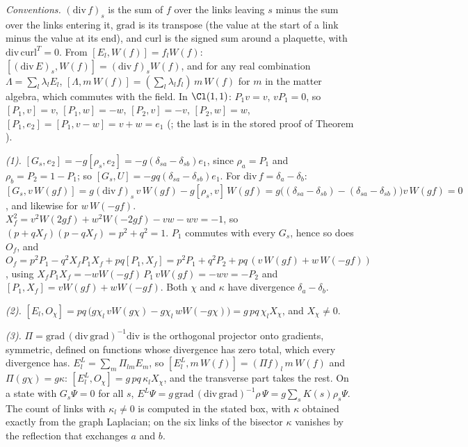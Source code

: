 \emph{Conventions.} $(\mathrm{div}\,f)_{s}$ is the sum of $f$ over the links leaving $s$ minus the sum over the links entering it, $\mathrm{grad}$ is its transpose (the value at the start of a link minus the value at its end), and $\mathrm{curl}$ is the signed sum around a plaquette, with $\mathrm{div}\,\mathrm{curl}^{T} = 0$. From $[E_{l}, W(f)] = f_{l}W(f)$: $[(\mathrm{div}\,E)_{s}, W(f)] = (\mathrm{div}\,f)_{s}W(f)$, and for any real combination $\Lambda = \sum_{l}\lambda_{l}E_{l}$, $[\Lambda, m\,W(f)] = (\sum_{l}\lambda_{l}f_{l})\,m\,W(f)$ for $m$ in the matter algebra, which commutes with the field. In $\Cl(1,1)$: $P_{1}v = v$, $vP_{1} = 0$, so $[P_{1}, v] = v$, $[P_{1}, w] = -w$, $[P_{2}, v] = -v$, $[P_{2}, w] = w$, $[P_{1}, e_{2}] = [P_{1}, v - w] = v + w = e_{1}$ (; the last is in the stored proof of Theorem ).

\emph{(1).} $[G_{s}, e_{2}] = -g[\rho_{s}, e_{2}] = -g(\delta_{sa} - \delta_{sb})e_{1}$, since $\rho_{a} = P_{1}$ and $\rho_{b} = P_{2} = 1 - P_{1}$; so $[G_{s}, U] = -gq(\delta_{sa} - \delta_{sb})e_{1}$. For $\mathrm{div}\,f = \delta_{a} - \delta_{b}$: $[G_{s}, v\,W(gf)] = g(\mathrm{div}\,f)_{s}\,v\,W(gf) - g[\rho_{s}, v]\,W(gf) = g\bigl((\delta_{sa} - \delta_{sb}) - (\delta_{sa} - \delta_{sb})\bigr)v\,W(gf) = 0$, and likewise for $w\,W(-gf)$. $X_{f}^{2} = v^{2}W(2gf) + w^{2}W(-2gf) - vw - wv = -1$, so $(p + qX_{f})(p - qX_{f}) = p^{2} + q^{2} = 1$. $P_{1}$ commutes with every $G_{s}$, hence so does $O_{f}$, and $O_{f} = p^{2}P_{1} - q^{2}X_{f}P_{1}X_{f} + pq[P_{1}, X_{f}] = p^{2}P_{1} + q^{2}P_{2} + pq\,(v\,W(gf) + w\,W(-gf))$, using $X_{f}P_{1}X_{f} = -wW(-gf)\,P_{1}\,vW(gf) = -wv = -P_{2}$ and $[P_{1}, X_{f}] = vW(gf) + wW(-gf)$. Both $\chi$ and $\kappa$ have divergence $\delta_{a} - \delta_{b}$.

\emph{(2).} $[E_{l}, O_{\chi}] = pq\,\bigl(g\chi_{l}\,vW(g\chi) - g\chi_{l}\,wW(-g\chi)\bigr) = g\,pq\,\chi_{l}X_{\chi}$, and $X_{\chi} \neq 0$.

\emph{(3).} $\Pi = \mathrm{grad}\,(\mathrm{div}\,\mathrm{grad})^{-1}\mathrm{div}$ is the orthogonal projector onto gradients, symmetric, defined on functions whose divergence has zero total, which every divergence has. $E^{L}_{l} = \sum_{m}\Pi_{lm}E_{m}$, so $[E^{L}_{l}, m\,W(f)] = (\Pi f)_{l}\,m\,W(f)$ and $\Pi(g\chi) = g\kappa$: $[E^{L}_{l}, O_{\chi}] = g\,pq\,\kappa_{l}X_{\chi}$, and the transverse part takes the rest. On a state with $G_{s}\Psi = 0$ for all $s$, $E^{L}\Psi = g\,\mathrm{grad}\,(\mathrm{div}\,\mathrm{grad})^{-1}\rho\,\Psi = g\sum_{s}K(s)\rho_{s}\Psi$. The count of links with $\kappa_{l} \neq 0$ is computed in the stated box, with $\kappa$ obtained exactly from the graph Laplacian; on the six links of the bisector $\kappa$ vanishes by the reflection that exchanges $a$ and $b$.

